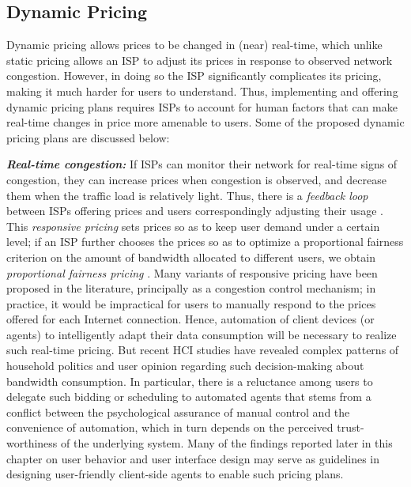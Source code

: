 
\subsection{Dynamic Pricing}\label{sec:dynamic}
Dynamic pricing allows prices to be changed in (near) real-time, which unlike static pricing allows an ISP to adjust its prices in response to observed network congestion. However, in doing so the ISP significantly complicates its pricing, making it much harder for users to understand. Thus, implementing and offering dynamic pricing plans requires ISPs to account for human factors that can make real-time changes in price more amenable to users. Some of the proposed dynamic pricing plans are discussed below:

\textbf{\emph{Real-time congestion:}} If ISPs can monitor their network for real-time signs of congestion, they can increase prices when congestion is observed, and decrease them when the traffic load is relatively light. Thus, there is a \emph{feedback loop} between ISPs offering prices and users correspondingly adjusting their usage \cite{Ganesh,Paschalidis}. This \emph{responsive pricing} sets prices so as to keep user demand under a certain level; if an ISP further chooses the prices so as to optimize a proportional fairness criterion on the amount of bandwidth allocated to different users, we obtain \emph{proportional fairness pricing} \cite{Courcoubetis,kelly1998rate,gibbens-kelly}. Many variants of responsive pricing have been proposed in the literature, principally as a congestion control mechanism; in practice, it would be impractical for users to manually respond to the prices offered for each Internet connection. Hence, automation of client devices (or agents) to intelligently adapt their data consumption will be necessary to realize such real-time pricing. But recent HCI studies \cite{chetty2010s,sigchi} have revealed complex patterns of household politics and user opinion regarding such decision-making about bandwidth consumption. In particular, there is a reluctance among users to delegate such bidding or scheduling to automated agents that stems from a conflict between the psychological assurance of manual control and the convenience of automation, which in turn depends on the perceived trust-worthiness of the underlying system. Many of the findings reported later in this chapter on user behavior and user interface design may serve as guidelines in designing user-friendly client-side agents to enable such pricing plans. 

